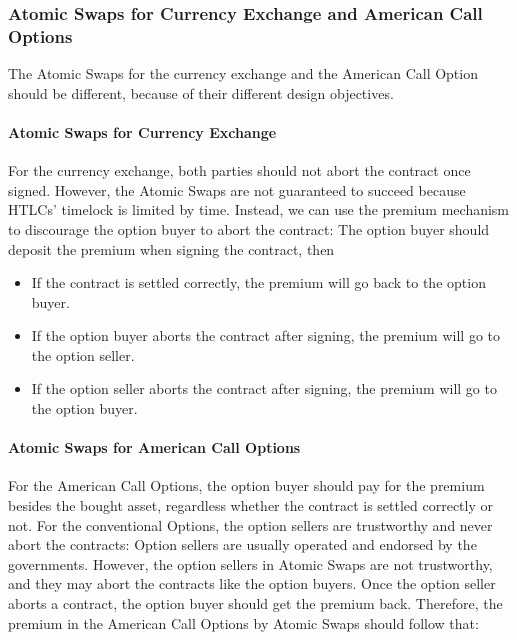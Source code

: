 \subsubsection{Atomic Swaps for Currency Exchange and American Call Options}

The Atomic Swaps for the currency exchange and the American Call Option should be different, because of their different design objectives.

\paragraph{Atomic Swaps for Currency Exchange}
For the currency exchange, both parties should not abort the contract once signed.
However, the Atomic Swaps are not guaranteed to succeed because HTLCs' timelock is limited by time.
Instead, we can use the premium mechanism to discourage the option buyer to abort the contract: The option buyer should deposit the premium when signing the contract, then

\begin{itemize}
    \item If the contract is settled correctly, the premium will go back to the option buyer.
    \item If the option buyer aborts the contract after signing, the premium will go to the option seller.
    \item If the option seller aborts the contract after signing, the premium will go to the option buyer.
\end{itemize}

\paragraph{Atomic Swaps for American Call Options}
For the American Call Options, the option buyer should pay for the premium besides the bought asset, regardless whether the contract is settled correctly or not. 
For the conventional Options, the option sellers are trustworthy and never abort the contracts: Option sellers are usually operated and endorsed by the governments.
However, the option sellers in Atomic Swaps are not trustworthy, 
 and they may abort the contracts like the option buyers.
Once the option seller aborts a contract, the option buyer should get the premium back.
Therefore, the premium in the American Call Options by Atomic Swaps should follow that: 

